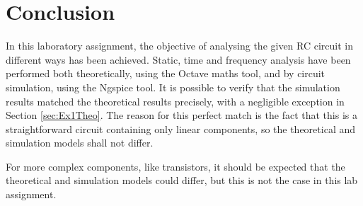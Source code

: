 \section{Conclusion}
\label{sec:conclusion}

In this laboratory assignment, the objective of analysing the given RC circuit in different ways has been achieved. Static, time and frequency analysis have been performed both theoretically, using the Octave maths tool, and by circuit simulation, using the Ngspice tool. It is possible to verify that the simulation results matched the theoretical results precisely, with a negligible exception in Section \ref{sec:Ex1Theo}. The reason for this perfect match is the fact that this is a straightforward circuit containing only linear components, so the theoretical and simulation models shall not differ.
\par
For more complex components, like transistors, it should be expected that the theoretical and simulation models could differ, but this is not the case in this lab assignment.
